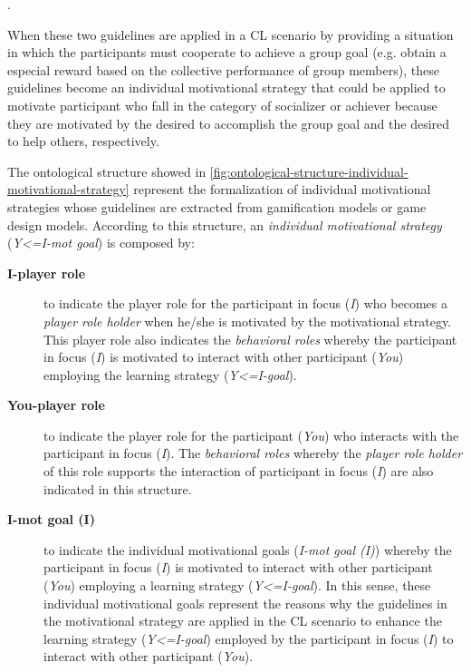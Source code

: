 \begin{citacao}
 .
\end{citacao}

When these two guidelines are applied in a CL scenario by providing a situation in which the participants must cooperate to achieve a group goal (e.g. obtain a especial reward based on the collective performance of group members), these guidelines become an individual motivational strategy that could be applied to motivate participant who fall in the category of socializer or achiever because they are motivated by the desired to accomplish the group goal and the desired to help others, respectively.

The ontological structure showed in \autoref{fig:ontological-structure-individual-motivational-strategy} represent the formalization of individual motivational strategies whose guidelines are extracted from gamification models or game design models.
According to this structure, an \emph{individual motivational strategy} (\emph{Y<=I-mot goal}) is composed by:

\begin{description}
\item[\textbf{I-player role}]
to indicate the player role for the participant in focus (\emph{I}) who becomes a \emph{player role holder} when he/she is motivated by the motivational strategy.
This player role also indicates the \emph{behavioral roles} whereby the participant in focus (\emph{I}) is motivated to interact with other participant (\emph{You}) employing the learning strategy (\emph{Y<=I-goal}).

\item[\textbf{You-player role}]
to indicate the player role for the participant (\emph{You}) who interacts with the participant in focus (\emph{I}).
The \emph{behavioral roles} whereby the \emph{player role holder} of this role supports the interaction of participant in focus (\emph{I}) are also indicated in this structure.

\item[\textbf{I-mot goal (I)}]
to indicate the individual motivational goals (\emph{I-mot goal (I)}) whereby the participant in focus (\emph{I}) is motivated to interact with other participant (\emph{You}) employing a learning strategy (\emph{Y<=I-goal}).
In this sense, these individual motivational goals represent the reasons why the guidelines in the motivational strategy are applied in the CL scenario to enhance the learning strategy (\emph{Y<=I-goal}) employed by the participant in focus (\emph{I}) to interact with other participant (\emph{You}).
\end{description}

